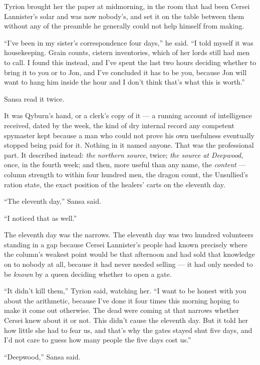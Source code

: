 Tyrion brought her the paper at midmorning, in the room that had been Cersei Lannister’s solar and was now nobody’s, and set it on the table between them without any of the preamble he generally could not help himself from making.

“I’ve been in my sister’s correspondence four days,” he said. “I told myself it was housekeeping. Grain counts, cistern inventories, which of her lords still had men to call. I found this instead, and I’ve spent the last two hours deciding whether to bring it to you or to Jon, and I’ve concluded it has to be you, because Jon will want to hang him inside the hour and I don’t think that’s what this is worth.”

Sansa read it twice.

It was Qyburn’s hand, or a clerk’s copy of it — a running account of intelligence received, dated by the week, the kind of dry internal record any competent spymaster kept because a man who could not prove his own usefulness eventually stopped being paid for it. Nothing in it named anyone. That was the professional part. It described instead: \textit{the northern source}, twice; \textit{the source at Deepwood}, once, in the fourth week; and then, more useful than any name, the \textit{content} — column strength to within four hundred men, the dragon count, the Unsullied’s ration state, the exact position of the healers’ carts on the eleventh day.

“The eleventh day,” Sansa said.

“I noticed that as well.”

The eleventh day was the narrows. The eleventh day was two hundred volunteers standing in a gap because Cersei Lannister’s people had known precisely where the column’s weakest point would be that afternoon and had sold that knowledge on to nobody at all, because it had never needed selling — it had only needed to be \textit{known} by a queen deciding whether to open a gate.

“It didn’t kill them,” Tyrion said, watching her. “I want to be honest with you about the arithmetic, because I’ve done it four times this morning hoping to make it come out otherwise. The dead were coming at that narrows whether Cersei knew about it or not. This didn’t cause the eleventh day. But it told her how little she had to fear us, and that’s why the gates stayed shut five days, and I’d not care to guess how many people the five days cost us.”

“Deepwood,” Sansa said.

